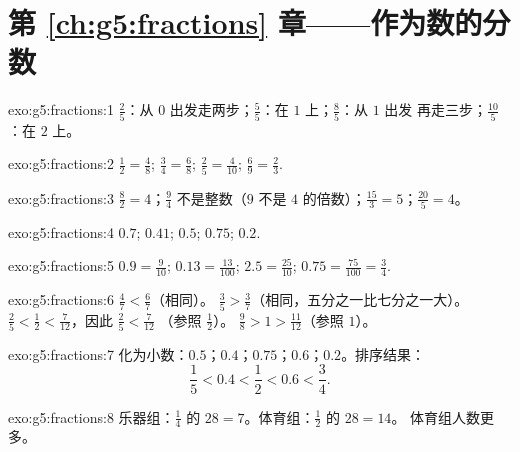 \section*{第 \ref{ch:g5:fractions} 章——作为数的分数}

\begin{solution}{exo:g5:fractions:1}
$\frac25$：从 $0$ 出发走两步；$\frac55$：在 $1$ 上；$\frac85$：从 $1$ 出发
再走三步；$\frac{10}{5}$：在 $2$ 上。
\end{solution}

\begin{solution}{exo:g5:fractions:2}
$\frac12 = \frac48$; \quad $\frac34 = \frac68$; \quad
$\frac25 = \frac{4}{10}$; \quad $\frac69 = \frac23$.
\end{solution}

\begin{solution}{exo:g5:fractions:3}
$\frac82 = 4$；\quad $\frac94$ 不是整数（$9$ 不是
$4$ 的倍数）；\quad $\frac{15}{3} = 5$；\quad $\frac{20}{5} = 4$。
\end{solution}

\begin{solution}{exo:g5:fractions:4}
$0.7$; \quad $0.41$; \quad $0.5$; \quad $0.75$; \quad $0.2$.
\end{solution}

\begin{solution}{exo:g5:fractions:5}
$0.9 = \frac{9}{10}$; \quad $0.13 = \frac{13}{100}$; \quad
$2.5 = \frac{25}{10}$; \quad $0.75 = \frac{75}{100} = \frac34$.
\end{solution}

\begin{solution}{exo:g5:fractions:6}
$\frac47 < \frac67$（相同）。\quad
$\frac35 > \frac37$（相同，五分之一比七分之一大）。\quad
$\frac25 < \frac12 < \frac{7}{12}$，因此 $\frac25 < \frac{7}{12}$
（参照 $\frac12$）。\quad
$\frac98 > 1 > \frac{11}{12}$（参照 $1$）。
\end{solution}

\begin{solution}{exo:g5:fractions:7}
化为小数：$0.5$；$0.4$；$0.75$；$0.6$；$0.2$。排序结果：
\[
\frac15 < 0.4 < \frac12 < 0.6 < \frac34 .
\]
\end{solution}

\begin{solution}{exo:g5:fractions:8}
乐器组：$\frac14$ 的 $28 = 7$。体育组：$\frac12$ 的 $28 = 14$。
体育组人数更多。
\end{solution}

